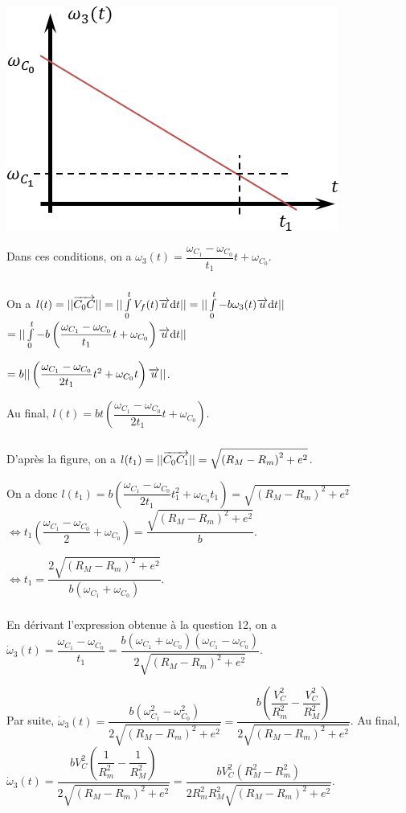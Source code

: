 \documentclass[10pt,fleqn]{article} %
\begin{document}
 \subparagraph{}
 
 \begin{center}
\includegraphics[width=.5\linewidth]{images/fig_05}
\end{center}

Dans ces conditions, on a $\omega_3(t)=\dfrac{\omega_{C_1}-\omega_{C_0}}{t_1}t+\omega_{C_0}$.

\subparagraph{} %
On a $l(t)=||\overrightarrow{C_0C}||=||\int\limits_0^t V_f(t)\overrightarrow{u} \text{d} t||=||\int\limits_0^t -b\omega_3(t) \overrightarrow{u} \text{d} t||$ 
$=||\int\limits_0^t -b\left( \dfrac{\omega_{C_1}-\omega_{C_0}}{t_1}t+\omega_{C_0}\right) \overrightarrow{u} \text{d} t||$

$=b|| \left(  \dfrac{\omega_{C_1}-\omega_{C_0}}{2t_1}t^2+\omega_{C_0}t\right) \overrightarrow{u} ||$.

Au final, 
$l(t)=bt \left(  \dfrac{\omega_{C_1}-\omega_{C_0}}{2t_1}t+\omega_{C_0}\right) $.


\subparagraph{} %
D'après la figure, on a  $l(t_1)=||\overrightarrow{C_0C_1}||=\sqrt{\left(R_M-R_m \right)^2+e^2}$.

On a donc $l(t_1)=b \left(  \dfrac{\omega_{C_1}-\omega_{C_0}}{2t_1}t_1^2+\omega_{C_0}t_1\right) =\sqrt{\left(R_M-R_m \right)^2+e^2}$ 
$\Leftrightarrow 
  t_1 \left(\dfrac{\omega_{C_1}-\omega_{C_0}}{2}+\omega_{C_0}\right) =\dfrac{\sqrt{\left(R_M-R_m \right)^2+e^2}}{b}$.

$\Leftrightarrow 
  t_1  =\dfrac{2\sqrt{\left(R_M-R_m \right)^2+e^2}}{b\left(\omega_{C_1}+\omega_{C_0} \right)}$.


\subparagraph{} %

En dérivant l'expression obtenue à la question 12, on a 
$\dot{\omega}_3(t)=\dfrac{\omega_{C_1}-\omega_{C_0}}{t_1} =  \dfrac{b\left( \omega_{C_1}+\omega_{C_0}\right)\left( \omega_{C_1}-\omega_{C_0}\right)}{2\sqrt{\left(R_M-R_m \right)^2+e^2}}  $. 

Par suite, $\dot{\omega}_3(t) =\dfrac{b\left( \omega_{C_1}^2-\omega_{C_0}^2\right)}{2\sqrt{\left(R_M-R_m \right)^2+e^2}}
=\dfrac{b\left( \dfrac{V_C^2}{R_m^2}-\dfrac{V_C^2}{R_M^2}\right)}{2\sqrt{\left(R_M-R_m \right)^2+e^2}}  $. 
Au final, 
$\dot{\omega}_3(t) 
= \dfrac{b V_C^2\left( \dfrac{1}{R_m^2}-\dfrac{1}{R_M^2}\right)}{2\sqrt{\left(R_M-R_m \right)^2+e^2}}
= \dfrac{b V_C^2\left(  R_M^2 - R_m^2 \right)}{2R_m^2R_M^2\sqrt{\left(R_M-R_m \right)^2+e^2}}
  $. 
\end{document}
